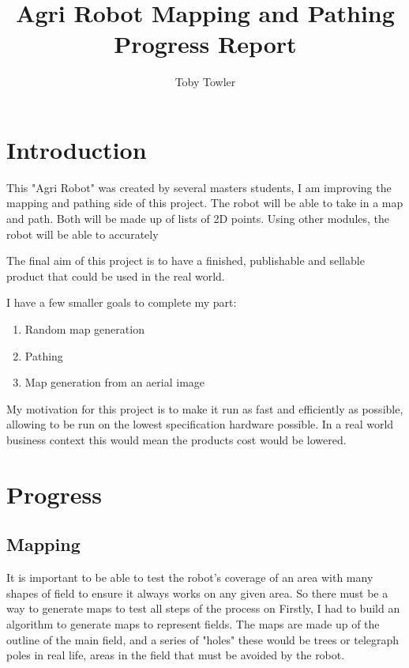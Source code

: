 \documentclass[progress]{cmpreport}
\title{Agri Robot Mapping and Pathing Progress Report}
\author{Toby Towler}
\begin{document}
\maketitle

\section{Introduction}
This "Agri Robot" was created by several masters students, I am improving the mapping and pathing side of this project.
The robot will be able to take in a map and path. Both will be made up of lists of 2D points. Using other modules, the robot will be able to accurately

The final aim of this project is to have a finished, publishable and sellable product that could be used in the real world.

I have a few smaller goals to complete my part:
\begin{enumerate}
	\item {Random map generation}
	\item {Pathing}
	\item {Map generation from an aerial image}
\end{enumerate}

My motivation for this project is to make it run as fast and efficiently as possible, allowing to be run on the lowest specification hardware possible.
In a real world business context this would mean the products cost would be lowered.



\section{Progress}
\subsection{Mapping}
It is important to be able to test the robot's coverage of an area with many shapes of field to ensure it always works on any given area.
So there must be a way to generate maps to test all steps of the process on
Firstly, I had to build an algorithm to generate maps to represent fields. The maps are made up of the outline of the main field,
and a series of "holes" these would be trees or telegraph poles in real life, areas in the field that must be avoided by the robot.
\end{document}
